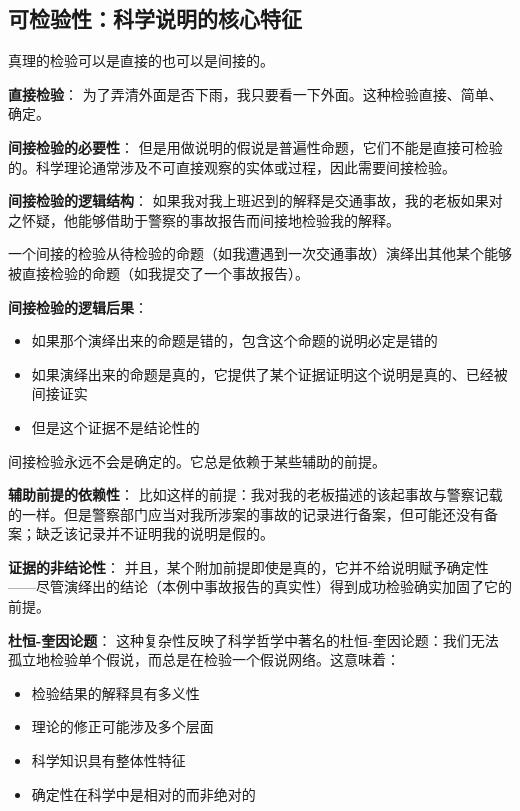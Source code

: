 \subsection{可检验性：科学说明的核心特征}

\begin{theorembox}[title=直接检验与间接检验]
真理的检验可以是直接的也可以是间接的。

\textbf{直接检验}：
为了弄清外面是否下雨，我只要看一下外面。这种检验直接、简单、确定。

\textbf{间接检验的必要性}：
但是用做说明的假说是普遍性命题，它们不能是直接可检验的。科学理论通常涉及不可直接观察的实体或过程，因此需要间接检验。

\textbf{间接检验的逻辑结构}：
如果我对我上班迟到的解释是交通事故，我的老板如果对之怀疑，他能够借助于警察的事故报告而间接地检验我的解释。

一个间接的检验从待检验的命题（如我遭遇到一次交通事故）演绎出其他某个能够被直接检验的命题（如我提交了一个事故报告）。

\textbf{间接检验的逻辑后果}：
\begin{itemize}
\item 如果那个演绎出来的命题是错的，包含这个命题的说明必定是错的
\item 如果演绎出来的命题是真的，它提供了某个证据证明这个说明是真的、已经被间接证实
\item 但是这个证据不是结论性的
\end{itemize}
\end{theorembox}

\begin{theorembox}[title=间接检验的局限性与复杂性]
间接检验永远不会是确定的。它总是依赖于某些辅助的前提。

\textbf{辅助前提的依赖性}：
比如这样的前提：我对我的老板描述的该起事故与警察记载的一样。但是警察部门应当对我所涉案的事故的记录进行备案，但可能还没有备案；缺乏该记录并不证明我的说明是假的。

\textbf{证据的非结论性}：
并且，某个附加前提即使是真的，它并不给说明赋予确定性——尽管演绎出的结论（本例中事故报告的真实性）得到成功检验确实加固了它的前提。

\textbf{杜恒-奎因论题}：
这种复杂性反映了科学哲学中著名的杜恒-奎因论题：我们无法孤立地检验单个假说，而总是在检验一个假说网络。这意味着：
\begin{itemize}
\item 检验结果的解释具有多义性
\item 理论的修正可能涉及多个层面
\item 科学知识具有整体性特征
\item 确定性在科学中是相对的而非绝对的
\end{itemize}
\end{theorembox}

